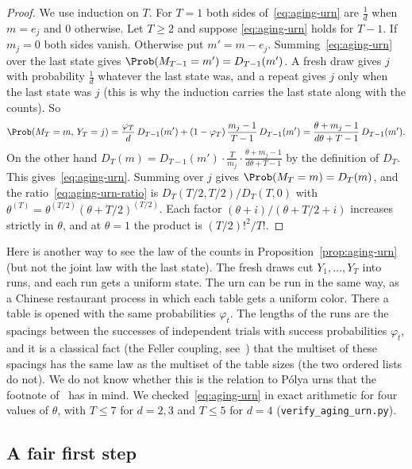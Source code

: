 \begin{proof}
We use induction on $T$. For $T=1$ both sides of~\eqref{eq:aging-urn} are
$\frac1d$ when $m=e_j$ and $0$ otherwise. Let $T\ge2$ and suppose
\eqref{eq:aging-urn} holds for $T-1$. If $m_j=0$ both sides vanish. Otherwise
put $m'=m-e_j$. Summing~\eqref{eq:aging-urn} over the last state gives
$\Prob(M_{T-1}=m')=D_{T-1}(m')$. A fresh draw gives $j$ with probability
$\frac1d$ whatever the last state was, and a repeat gives $j$ only when the
last state was $j$ (this is why the induction carries the last state along
with the counts). So
\[
 \Prob(M_T=m,\,Y_T=j)
 =\frac{\varphi_T}{d}\,D_{T-1}(m')+(1-\varphi_T)\,\frac{m_j-1}{T-1}\,D_{T-1}(m')
 =\frac{\theta+m_j-1}{d\theta+T-1}\,D_{T-1}(m') .
\]
On the other hand
$D_T(m)=D_{T-1}(m')\cdot\frac{T}{m_j}\cdot\frac{\theta+m_j-1}{d\theta+T-1}$ by
the definition of $D_T$. This gives~\eqref{eq:aging-urn}. Summing over $j$
gives $\Prob(M_T=m)=D_T(m)$, and the ratio~\eqref{eq:aging-urn-ratio} is
$D_T(T/2,T/2)/D_T(T,0)$ with
$\theta^{(T)}=\theta^{(T/2)}(\theta+T/2)^{(T/2)}$. Each factor
$(\theta+i)/(\theta+T/2+i)$ increases strictly in $\theta$, and at
$\theta=1$ the product is $(T/2)!^2/T!$.
\end{proof}

\begin{remark}\label{rem:aging-feller}
Here is another way to see the law of the counts in
Proposition~\ref{prop:aging-urn} (but not the joint law with the last state).
The fresh draws
cut $Y_1,\dots,Y_T$ into runs, and each run gets a uniform state. The urn can
be run in the same way, as a Chinese restaurant process in which each table
gets a uniform color. There a table is opened with the same probabilities
$\varphi_t$. The lengths of the runs are the spacings between the successes of
independent trials with success probabilities $\varphi_t$, and it is a classical
fact (the Feller coupling, see~\cite{abt2003}) that the multiset of these spacings has
the same law as the multiset of the table sizes (the two ordered lists do not). We do not know whether this is the relation
to P\'olya urns that the footnote of~\cite{evw2020} has in mind. We
checked~\eqref{eq:aging-urn} in exact arithmetic for four values of $\theta$,
with $T\le7$ for $d=2,3$ and $T\le5$ for $d=4$
(\texttt{verify\_aging\_urn.py}).
\end{remark}

\subsection{A fair first step}

